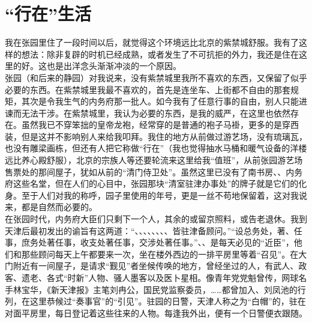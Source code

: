 \fancyhead[RO]{} %
\fancyhead[LE]{} %
\chapter*{“行在”生活}
\thispagestyle{empty}
我在张园里住了一段时间以后，就觉得这个环境远比北京的紫禁城舒服。我有了这样的想法：除非复辟的时机已经成熟，或者发生了不可抗拒的外力，我还是住在这里的好。这也是出洋念头渐渐冲淡的一个原因。\\

张园（和后来的静园）对我说来，没有紫禁城里我所不喜欢的东西，又保留了似乎必要的东西。在紫禁城里我最不喜欢的，首先是连坐车、上街都不自由的那套规矩，其次是令我生气的内务府那一批人。如今我有了任意行事的自由，别人只能进谏而无法干涉。在紫禁城里，我认为必要的东西，是我的威严，在这里也依然存在。虽然我已不穿笨拙的皇帝龙袍，经常穿的是普通的袍子马褂，更多的是穿西装，但是这并不影响别人来给我叩拜。我住的地方从前做过游艺场，没有琉璃瓦，也没有雕梁画栋，但还有人把它称做“行在”（我也觉得抽水马桶和暖气设备的洋楼远比养心殿舒服），北京的宗族人等还要轮流来这里给我“值班”，从前张园游艺场售票处的那间屋子，犹如从前的“清门侍卫处”。虽然这里已没有了南书房、、内务府这些名堂，但在人们的心目中，张园那块“清室驻津办事处”的牌子就是它们的化身。至于人们对我的称呼，园子里使用的年号，更是一丝不苟地保留着，这对我说来，都是自然而必要的。\\

在张园时代，内务府大臣们只剩下一个人，其余的或留京照料，或告老退休。我到天津后最初发出的谕旨有这两道：“、、、、、、、、皆驻津备顾问。”“设总务处，著、任事，庶务处著任事，收支处著任事，交涉处著任事。”、、是每天必见的“近臣”，他们和那些顾问每天上午都要来一次，坐在楼外西边的一排平房里等着“召见”。在大门附近有一间屋子，是请求“觐见”者坐候传唤的地方，曾经坐过的人，有武人、政客、遗老、各式“时新”人物、骚人墨客以及医卜星相。像青年党党魁曾传，网球名手林宝华，《新天津报》主笔刘冉公，国民党监察委员，……都曾加入、刘凤池的行列，在这里恭候过“奏事官”的“引见”。驻园的日警，天津人称之为“白帽”的，驻在对面平房里，每日登记着这些往来的人物。每逢我外出，便有一个日警便衣跟随。\\

